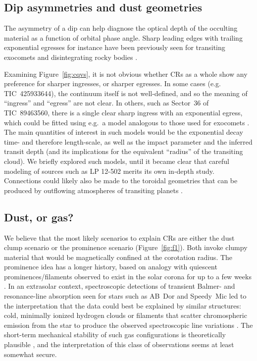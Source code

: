 \documentclass[11pt,twocolumn,tighten]{aastex63}
\begin{document}
\subsection{Dip asymmetries and dust geometries}

The asymmetry of a dip can help diagnose the optical depth of the
occulting material as a function of orbital phase angle.  Sharp
leading edges with trailing exponential egresses for instance have
been previously seen for transiting exocomets and disintegrating rocky
bodies
\citep[e.g.][]{2012ApJ...752....1R,2012A&A...545L...5B,2015Natur.526..546V,2019A&A...625L..13Z}.

Examining Figure~\ref{fig:cqvs}, it is not obvious whether CRs as a
whole show any preference for sharper ingresses, or sharper egresses.
In some cases (e.g. TIC~425933644), the continuum itself is not
well-defined, and so the meaning of ``ingress'' and ``egress'' are not
clear.  In others, such as Sector~36 of TIC~89463560, there is a
single clear sharp ingress with an exponential egress, which could be
fitted using e.g.~a model analogous to those used for exocomets
\citep[e.g.][]{2018MNRAS.474.1453R,2019A&A...625L..13Z}.  The main quantities of interest
in such models would be the exponential decay time- and therefore
length-scale, as well as the impact parameter and the inferred transit
depth (and its implications for the equivalent ``radius'' of the
transiting cloud).  We briefly explored such models, until it
became clear that careful modeling of sources such as LP
12-502 merits its own in-depth study.  Connections could likely also
be made to the toroidal geometries that can be produced by outflowing
atmospheres of transiting planets
\citep[e.g.][]{2019ApJ...873...89M,2022ApJ...926..226M}.



\subsection{Dust, or gas?}

We believe that the most likely scenarios to explain CRs are either
the dust clump scenario or the prominence scenario
(Figure~\ref{fig:f1}).  Both invoke clumpy material that would be
magnetically confined at the corotation radius.  The prominence idea
has a longer history, based on analogy with quiescent
prominences/filaments observed to exist in the solar corona for up to
a few weeks \citep[see][]{2015ASSL..415.....V}.  In an extrasolar
context, spectroscopic detections of transient Balmer- and
resonance-line absorption seen for stars such as AB~Dor and Speedy~Mic
\citep[e.g.][]{1989MNRAS.238..657C,1993MNRAS.262..369J,2006MNRAS.365..530D,2016MNRAS.463..965L}
led to the interpretation that the data could best be explained by
similar structures: cold, minimally ionized hydrogen clouds or
filaments that scatter chromospheric emission from the star to produce
the observed spectroscopic line variations
\citep[see][]{1989MNRAS.238..657C}.  The short-term mechanical
stability of such gas configurations is theoretically plausible
\citep{2000MNRAS.316..647F,2022MNRAS.514.5465W}, and the
interpretation of this class of observations seems at least somewhat
secure.
\end{document}
